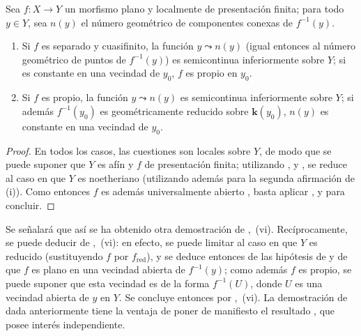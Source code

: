 
\begin{proposition}[15.5.9]
\label{IV.15.5.9}
Sea $f:X\to Y$ un morfismo plano y localmente de presentación finita; para todo $y\in Y$, sea $n(y)$ el número geométrico de componentes conexas de $f^{-1}(y)$.
\begin{enumerate}[label=(\roman*)]
  \item Si $f$ es separado y cuasifinito, la función $y\leadsto n(y)$ \textup{(igual entonces al número geométrico de puntos de $f^{-1}(y)$)} es semicontinua inferiormente sobre $Y$; si es constante en una vecindad de $y_0$, $f$ es propio en $y_0$.
  \item Si $f$ es propio, la función $y\leadsto n(y)$ es semicontinua inferiormente sobre $Y$; si además $f^{-1}(y_0)$ es geométricamente reducido sobre $\boldsymbol{k}(y_0)$, $n(y)$ es constante en una vecindad de $y_0$.
\end{enumerate}
\end{proposition}

\begin{proof}
En todos los casos, las cuestiones son locales sobre $Y$, de modo que se puede suponer que $Y$ es afín y $f$ de presentación finita; utilizando ,  y , se reduce al caso en que $Y$ es noetheriano (utilizando además  para la segunda afirmación de (i)).
Como entonces $f$ es además universalmente abierto , basta aplicar ,  y  para concluir.
\end{proof}

\begin{remarks}[15.5.10]
\label{IV.15.5.10}
Se señalará que así se ha obtenido otra demostración de ,~(vi).
Recíprocamente, se puede deducir  de ,~(vi): en efecto, se puede limitar al caso en que $Y$ es reducido (sustituyendo $f$ por $f_{\mathrm{red}}$), y se deduce entonces de las hipótesis de  y de  que $f$ es plano en una vecindad abierta de $f^{-1}(y)$; como además $f$ es propio, se puede suponer que esta vecindad es de la forma $f^{-1}(U)$, donde $U$ es una vecindad abierta de $y$ en $Y$.
Se concluye entonces por ,~(vi).
La demostración de  dada anteriormente tiene la ventaja de poner de manifiesto el resultado , que posee interés independiente.
\end{remarks}


